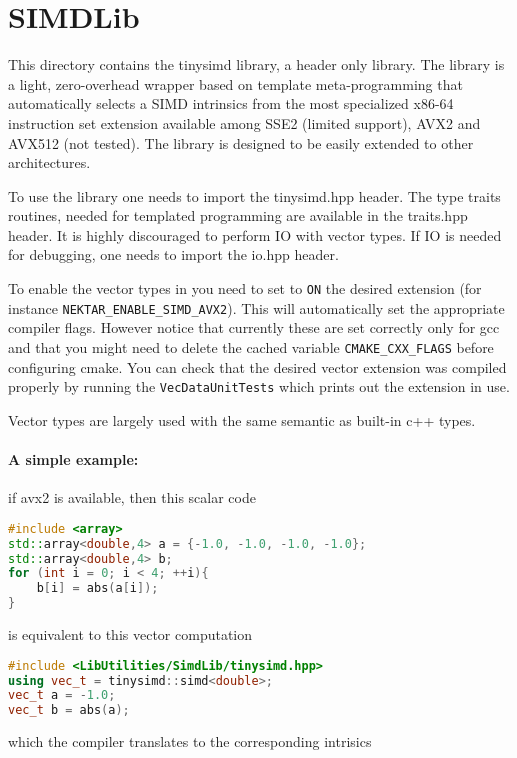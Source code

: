 %
\section{SIMDLib}

This directory contains the tinysimd library, a header only library.
The library is a light, zero-overhead wrapper based on template meta-programming that automatically selects a SIMD intrinsics from the most specialized x86-64 instruction set extension available among SSE2 (limited support), AVX2 and AVX512 (not tested).
The library is designed to be easily extended to other architectures.

To use the library one needs to import the tinysimd.hpp header.
The type traits routines, needed for templated programming are available in the traits.hpp header.
It is highly discouraged to perform IO with vector types. If IO is needed for debugging, one needs to import the io.hpp header.

To enable the vector types in {\nek} you need to set to \verb+ON+ the desired extension (for instance \verb+NEKTAR_ENABLE_SIMD_AVX2+).
This will automatically set the appropriate compiler flags. However notice that currently these are set correctly only for gcc and that you might need to delete the cached variable \verb+CMAKE_CXX_FLAGS+ before configuring cmake.
You can check that the desired vector extension was compiled properly by running the \verb+VecDataUnitTests+ which prints out the extension in use.


Vector types are largely used with the same semantic as built-in c++ types.

\paragraph{A simple example: } if avx2 is available, then this scalar code
\begin{lstlisting}[language=C++]
#include <array>
std::array<double,4> a = {-1.0, -1.0, -1.0, -1.0};
std::array<double,4> b;
for (int i = 0; i < 4; ++i){
    b[i] = abs(a[i]);
}
\end{lstlisting}

is equivalent to this vector computation

\begin{lstlisting}[language=C++]
#include <LibUtilities/SimdLib/tinysimd.hpp>
using vec_t = tinysimd::simd<double>;
vec_t a = -1.0;
vec_t b = abs(a);
\end{lstlisting}

which the compiler translates to the corresponding intrisics

